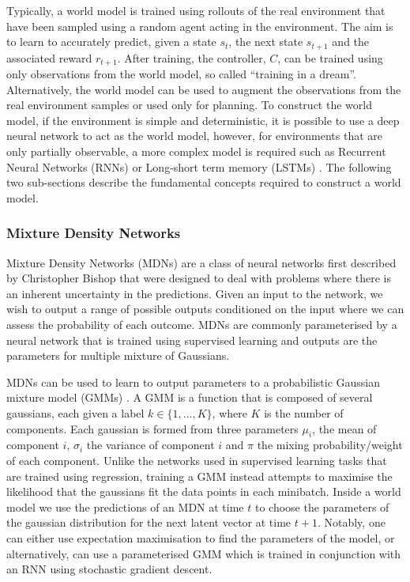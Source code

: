 Typically, a world model is trained using rollouts of the real environment that have been sampled using a random agent acting in the environment. The aim is to learn to accurately predict, given a state $s_t$, the next state $s_{t+1}$ and the associated reward $r_{t+1}$. After training, the controller, $C$, can be trained using only observations from the world model, so called ``training in a dream''. Alternatively, the world model can be used to augment the observations from the real environment samples or used only for planning. To construct the world model, if the environment is simple and deterministic, it is possible to use a deep neural network to act as the world model, however, for environments that are only partially observable, a more complex model is required such as Recurrent Neural Networks (RNNs) \cite{650093, Hochreiter:01book} or Long-short term memory (LSTMs) \cite{hochreiter1997long, gers1999learning}. The following two sub-sections describe the fundamental concepts required to construct a world model.

\subsubsection{Mixture Density Networks}
Mixture Density Networks (MDNs) are a class of neural networks first described by Christopher Bishop \cite{bishop1994mixture} that were designed to deal with problems where there is an inherent uncertainty in the predictions. Given an input to the network, we wish to output a range of possible outputs conditioned on the input where we can assess the probability of each outcome. MDNs are commonly parameterised by a neural network that is trained using supervised learning and outputs are the parameters for multiple mixture of Gaussians.

MDNs can be used to learn to output parameters to a probabilistic Gaussian mixture model (GMMs) \cite{bishop1994mixture}. A GMM is a function that is composed of several gaussians, each given a label $k \in \lbrace 1, \ldots, K \rbrace$, where $K$ is the number of components. Each gaussian is formed from three parameters $\mu_i$, the mean of component $i$, $\sigma_i$ the variance of component $i$ and $\pi$ the mixing probability/weight of each component. Unlike the networks used in supervised learning tasks that are trained using regression, training a GMM instead attempts to maximise the likelihood that the gaussians fit the data points in each minibatch. Inside a world model we use the predictions of an MDN at time $t$ to choose the parameters of the gaussian distribution for the next latent vector at time $t+1$. Notably, one can either use expectation maximisation to find the parameters of the model, or alternatively, can use a parameterised GMM which is trained in conjunction with an RNN using stochastic gradient descent.

